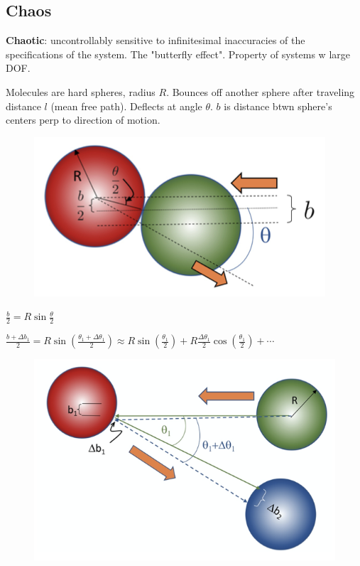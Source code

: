 



\subsection{Chaos}

\textbf{Chaotic}: uncontrollably sensitive to infinitesimal inaccuracies of the specifications of the system. The "butterfly effect". Property of systems w large DOF.

Molecules are hard spheres, radius $R$. Bounces off another sphere after traveling distance $l$ (mean free path). Deflects at angle $\theta$. $b$ is distance btwn sphere's centers perp to direction of motion.

\begin{figure}[h]
    \centering
    \includegraphics[width=0.7\linewidth]{figures/03_01.png}
\end{figure}

$\frac{b}{2} = R \sin \frac{\theta}{2}$

$\frac{b+ \Delta b_1}{2} = R \sin(\frac{\theta_1 + \Delta \theta_1}{2}) \approx R \sin(\frac{\theta_1}{2}) + R \frac{\Delta \theta_1}{2} \cos(\frac{\theta_1}{2}) + \cdots$

\begin{figure}[h]
    \centering
    \includegraphics[width=0.8\linewidth]{figures/03_02.png}
\end{figure}

